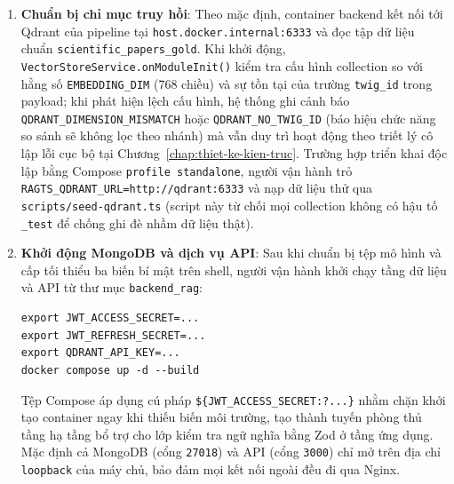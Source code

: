 \begin{enumerate}
    \item \textbf{Chuẩn bị chỉ mục truy hồi}: Theo mặc định, container backend kết nối tới Qdrant của pipeline tại \texttt{host.\allowbreak{}docker.\allowbreak{}internal:\allowbreak{}6333} và đọc tập dữ liệu chuẩn \texttt{scientific\_\allowbreak{}papers\_\allowbreak{}gold}. Khi khởi động, \texttt{VectorStoreService.\allowbreak{}onModuleInit()} kiểm tra cấu hình collection so với hằng số \texttt{EMBEDDING\_\allowbreak{}DIM} (768 chiều) và sự tồn tại của trường \texttt{twig\_\allowbreak{}id} trong payload; khi phát hiện lệch cấu hình, hệ thống ghi cảnh báo \texttt{QDRANT\_\allowbreak{}DIMENSION\_\allowbreak{}MISMATCH} hoặc \texttt{QDRANT\_\allowbreak{}NO\_\allowbreak{}TWIG\_\allowbreak{}ID} (báo hiệu chức năng so sánh sẽ không lọc theo nhánh) mà vẫn duy trì hoạt động theo triết lý cô lập lỗi cục bộ tại Chương~\ref{chap:thiet-ke-kien-truc}. Trường hợp triển khai độc lập bằng Compose \texttt{profile standalone}, người vận hành trỏ \texttt{RAGTS\_\allowbreak{}QDRANT\_\allowbreak{}URL=\allowbreak{}http:\allowbreak{}/\allowbreak{}/\allowbreak{}qdrant:\allowbreak{}6333} và nạp dữ liệu thử qua \texttt{scripts/\allowbreak{}seed-\allowbreak{}qdrant.\allowbreak{}ts} (script này từ chối mọi collection không có hậu tố \texttt{\_\allowbreak{}test} để chống ghi đè nhầm dữ liệu thật).

    \item \textbf{Khởi động MongoDB và dịch vụ API}: Sau khi chuẩn bị tệp mô hình và cấp tối thiểu ba biến bí mật trên shell, người vận hành khởi chạy tầng dữ liệu và API từ thư mục \texttt{backend\_\allowbreak{}rag}:
\begin{verbatim}
export JWT_ACCESS_SECRET=...
export JWT_REFRESH_SECRET=...
export QDRANT_API_KEY=...
docker compose up -d --build
\end{verbatim}
    Tệp Compose áp dụng cú pháp \texttt{\$\{JWT\_\allowbreak{}ACCESS\_\allowbreak{}SECRET:\allowbreak{}?...\}} nhằm chặn khởi tạo container ngay khi thiếu biến môi trường, tạo thành tuyến phòng thủ tầng hạ tầng bổ trợ cho lớp kiểm tra ngữ nghĩa bằng Zod ở tầng ứng dụng. Mặc định cả MongoDB (cổng \texttt{27018}) và API (cổng \texttt{3000}) chỉ mở trên địa chỉ \texttt{loopback} của máy chủ, bảo đảm mọi kết nối ngoài đều đi qua Nginx.


\end{enumerate}
